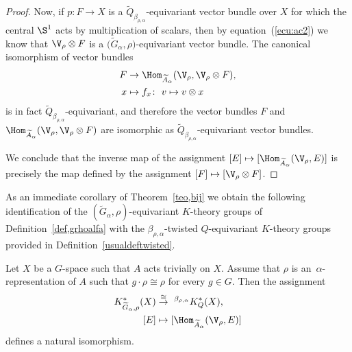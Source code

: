 \begin{proof}
Now, if $p\colon F\rightarrow X$ is a
$\widetilde{Q}_{\beta_{\rho,\alpha}}$-equivariant vector bundle over $X$
for which the central $\S^{1}$ acts by multiplication of
scalars, then by equation~(\ref{ecu:ac2}) we know that
$\V_{\rho}\otimes F$ is a
$\big(\widetilde{G}_{\alpha},\rho\big)$-equivariant vector bundle.
The canonical isomorphism of vector bundles
\begin{align*}
F&\rightarrow \Hom_{\widetilde{A}_{\alpha}}(
\V_{\rho}, \V_{\rho}\otimes F),
\\
x&\mapsto f_{x}\colon\ v\mapsto v\otimes x
\end{align*}
is in fact $\widetilde{Q}_{\beta_{\rho,\alpha}}$-equivariant, and therefore the vector
bundles $F$ and
$\Hom_{\widetilde{A}_{\alpha}}(\V_{\rho},\V_{\rho}\otimes
F)$ are isomorphic as
$\widetilde{Q}_{\beta_{\rho,\alpha}}$-equivariant vector bundles.
	
We conclude that the inverse map of the assignment
$[E]\mapsto[\Hom_{\widetilde{A}_{\alpha}}(\V_{\rho},E)]$
is precisely the map defined by the assignment $[F]\mapsto
[\V_{\rho}\otimes F]$.
\end{proof}


As an immediate corollary of Theorem~\ref{teo,bij} we obtain the following
identification of the $(\widetilde{G}_{\alpha}, \rho)$-equivariant $K$-theory groups of
Definition~\ref{def,grhoalfa} with the $\beta_{\rho,\alpha}$-twisted $Q$-equivariant
$K$-theory groups provided in Definition~\ref{usualdeftwisted}.

\begin{Cor}\label{identification}
Let $X$ be a $G$-space such that $A$ acts trivially on $X$. Assume that
$\rho$ is an~$\alpha$-re\-p\-resentation of $A$ such that
$g\cdot \rho\cong \rho$ for every $g\in G$. Then the assignment
\begin{align*}
K^{\ast}_{\widetilde{G}_{\alpha}, \rho}(X)
&\stackrel{\cong}{\rightarrow} \ ^{\beta_{\rho,\alpha}}K^{\ast}_{Q}(X),
\\
[E]&\mapsto [\Hom_{\widetilde{A}_{\alpha}}(\V_{\rho},E)]
\end{align*}
defines a natural isomorphism.
\end{Cor}

